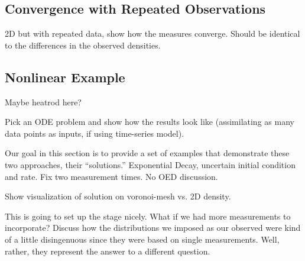 \subsection{Convergence with Repeated Observations}
2D but with repeated data, show how the measures converge. Should be identical to the differences in the observed densities.

\subsection{Nonlinear Example}
Maybe heatrod here?


Pick an ODE problem and show how the results look like (assimilating as many data points as inputs, if using time-series model).

Our goal in this section is to provide a set of examples that demonstrate these two approaches, their ``solutions.''
Exponential Decay, uncertain initial condition and rate. Fix two measurement times. No OED discussion.

Show visualization of solution on voronoi-mesh vs. 2D density.

This is going to set up the stage nicely.
What if we had more measurements to incorporate? Discuss how the distributions we imposed as our observed were kind of a little disingenuous since they were based on single measurements. Well, rather, they represent the answer to a different question.
